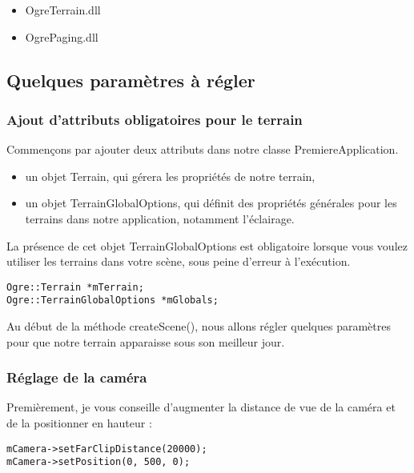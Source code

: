 \documentclass[10pt,a4paper]{report}
\begin{document}
\begin{itemize}
\item OgreTerrain.dll
\item OgrePaging.dll
\end{itemize}




\subsection{Quelques param\`etres \`a r\'egler}

\subsubsection{Ajout d'attributs obligatoires pour le terrain}

Commen\c{c}ons par ajouter deux attributs dans notre classe PremiereApplication.

\begin{itemize}
\item un objet Terrain, qui g\'erera les propri\'et\'es de notre terrain,
\item un objet TerrainGlobalOptions, qui d\'efinit des propri\'et\'es g\'en\'erales pour les terrains dans notre application, notamment l'\'eclairage.\newline
\end{itemize}

La pr\'esence de cet objet TerrainGlobalOptions est obligatoire lorsque vous voulez utiliser les terrains dans votre sc\`ene, sous peine d'erreur \`a l'ex\'ecution.

\begin{lstlisting}[caption={Attributs pour la gestion de terrain}]
Ogre::Terrain *mTerrain;
Ogre::TerrainGlobalOptions *mGlobals;
\end{lstlisting}

Au d\'ebut de la m\'ethode createScene(), nous allons r\'egler quelques param\`etres pour que notre terrain apparaisse sous son meilleur jour.

\subsubsection{R\'eglage de la cam\'era}
Premi\`erement, je vous conseille d'augmenter la distance de vue de la cam\'era et de la positionner en hauteur :

\begin{lstlisting}[caption={R\'eglage de la cam\'era}]
mCamera->setFarClipDistance(20000);
mCamera->setPosition(0, 500, 0);
\end{lstlisting}
\end{document}
